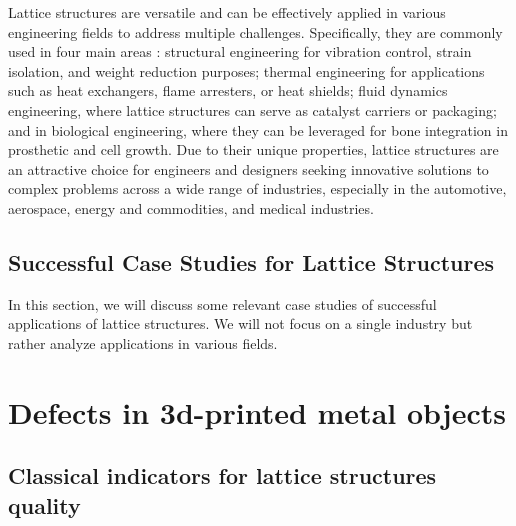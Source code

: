 Lattice structures are versatile and can be effectively applied in various engineering fields to address multiple challenges. Specifically, they are commonly used in four main areas \cite{bhate_classification_2019}: structural engineering for vibration control, strain isolation, and weight reduction purposes; thermal engineering for applications such as heat exchangers, flame arresters, or heat shields; fluid dynamics engineering, where lattice structures can serve as catalyst carriers or packaging; and in biological engineering, where they can be leveraged for bone integration in prosthetic and cell growth. Due to their unique properties, lattice structures are an attractive choice for engineers and designers seeking innovative solutions to complex problems across a wide range of industries, especially in the automotive, aerospace, energy and commodities, and medical industries.
\subsection{Successful Case Studies for Lattice Structures} \label{subsec:casestudieslattice}
In this section, we will discuss some relevant case studies of successful applications of lattice structures. We will not focus on a single industry but rather analyze applications in various fields.
\section{Defects in 3d-printed metal objects}
\subsection{Classical indicators for lattice structures quality}